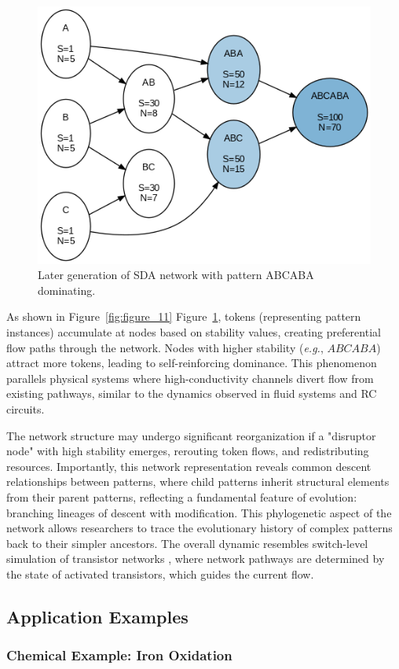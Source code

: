 \documentclass[preprint,12pt]{elsarticle}
\begin{document}
\begin{figure}[h]
    \centering
    \includegraphics[width=0.6\linewidth]{figure_12.png}
    \caption{Later generation of SDA network with pattern ABCABA dominating.}
    \label{fig:figure_12}
\end{figure}

As shown in Figure~\ref{fig:figure_11} Figure~\ref{fig:figure_12}, tokens (representing pattern instances) accumulate at nodes based on stability values, creating preferential flow paths through the network. Nodes with higher stability (\textit{e.g.}, $ABCABA$) attract more tokens, leading to self-reinforcing dominance. This phenomenon parallels physical systems where high-conductivity channels divert flow from existing pathways, similar to the dynamics observed in fluid systems and RC circuits.

The network structure may undergo significant reorganization if a "disruptor node" with high stability emerges, rerouting token flows, and redistributing resources. Importantly, this network representation reveals common descent relationships between patterns, where child patterns inherit structural elements from their parent patterns, reflecting a fundamental feature of evolution: branching lineages of descent with modification. This phylogenetic aspect of the network allows researchers to trace the evolutionary history of complex patterns back to their simpler ancestors. The overall dynamic resembles switch-level simulation of transistor networks \cite{AdlerCAD}, where network pathways are determined by the state of activated transistors, which guides the current flow.


\subsection{Application Examples}



\subsubsection{Chemical Example: Iron Oxidation}
\end{document}
